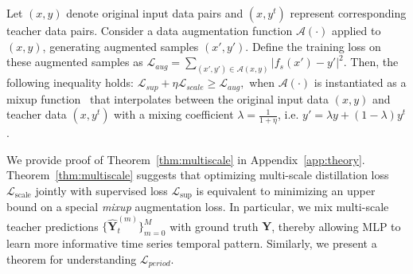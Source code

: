 \begin{theorem} \label{thm:multiscale}
Let $(x, y)$ denote original input data pairs and $(x, y^t)$ represent corresponding teacher data pairs. Consider a data augmentation function $\mathcal{A}(\cdot)$ applied to $(x, y)$, generating augmented samples $(x', y')$. Define the training loss on these augmented samples as $\mathcal{L}_{aug} = \sum_{(x',y') \in \mathcal{A}(x,y)} |f_s(x') - y'|^2$. Then, the following inequality holds: 
$
   \mathcal{L}_{sup} + \eta \mathcal{L}_{scale} \geq \mathcal{L}_{aug},
$
when $\mathcal{A}(\cdot)$ is instantiated as a mixup function~\cite{mixup} that interpolates between the original input data $(x,y)$ and teacher data $(x,y^t)$ with a mixing coefficient $\lambda=\frac{1}{1+\eta}$, i.e. $y' = \lambda y + (1-\lambda) y^t$.
\end{theorem}
We provide proof of Theorem~\ref{thm:multiscale} in Appendix~\ref{app:theory}.  Theorem~\ref{thm:multiscale} suggests that optimizing multi-scale distillation loss \(\mathcal{L}_{\text{scale}}\) jointly with supervised loss \(\mathcal{L}_{\text{sup}}\) is equivalent to minimizing an upper bound on a special \textit{mixup} augmentation loss. In particular, we mix multi-scale teacher predictions \(\{\mathbf{\hat{Y}}_t^{(m)}\}_{m=0}^M\) with ground truth \(\mathbf{Y}\), thereby allowing MLP to learn more informative time series temporal pattern. Similarly, we present a theorem for understanding $\mathcal{L}_{period}$.

